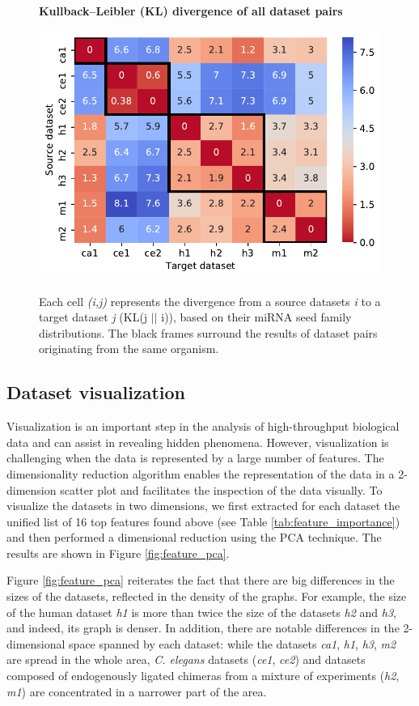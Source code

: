 \begin{figure}[h!]
  \caption{\textbf{Kullback–Leibler (KL) divergence of all dataset pairs}}
      \includegraphics[width = 1\textwidth]{figures/4_divergence_reverse.pdf}
      \label{fig:divergence}
      \caption*{Each cell \textit{(i,j)} represents the divergence from  a source datasets \textit{i} to a target dataset \textit{j} (KL(j $||$ i)), based on their miRNA seed family distributions. The black frames surround the results of dataset pairs originating from the same organism.}
      \end{figure}


\subsection{Dataset visualization}
Visualization is an important step in the analysis of high-throughput biological data and can assist in revealing hidden phenomena. However, visualization is challenging when the data is represented by a large number of features. The dimensionality reduction algorithm enables the representation of the data in a 2-dimension scatter plot and facilitates the inspection of the data visually. To visualize the datasets in two dimensions, we first extracted for each dataset the unified list of 16 top features found above (see Table \ref{tab:feature_importance}) and then performed a dimensional reduction using the PCA technique. The results are shown in Figure \ref{fig:feature_pca}.

Figure \ref{fig:feature_pca} reiterates the fact that there are big differences in the sizes of the datasets, reflected in the density of the graphs. For example, the size of the human dataset \textit{h1} is more than twice the size of the datasets \textit{h2} and \textit{h3}, and indeed, its graph is denser. In addition, there are notable differences in the 2-dimensional space spanned by each dataset: while the datasets \textit{ca1}, \textit{h1}, \textit{h3}, \textit{m2} are spread in the whole area, \textit{C. elegans} datasets (\textit{ce1}, \textit{ce2}) and datasets composed of endogenously ligated chimeras from a mixture of experiments (\textit{h2}, \textit{m1}) are concentrated in a narrower part of the area.


